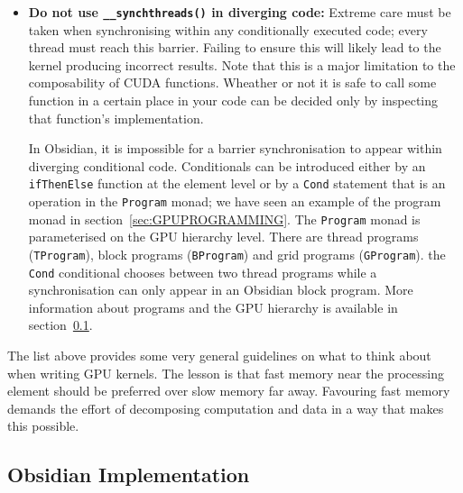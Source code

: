 \documentclass[a4paper]{book}
\begin{document}
\begin{itemize}
\item {\bf Do not use {\tt \_\_synchthreads()} in diverging code:} Extreme care must be taken 
when synchronising within any conditionally executed code; every thread must reach this barrier.
Failing to ensure this will likely lead to the kernel producing incorrect results. Note that 
this is a major limitation to the composability of CUDA functions. Wheather or not it is safe to 
call some function in a certain place in your code can be decided only by inspecting that 
function's implementation. 

In Obsidian, it is impossible for a barrier synchronisation to appear within diverging 
conditional code. Conditionals can be introduced either by an \\{\tt ifThenElse} function 
at the element level or by a {\tt Cond} statement that is an operation in the {\tt Program} 
monad; we have seen an example of the program monad in section~\ref{sec:GPUPROGRAMMING}. 
The {\tt Program} monad is parameterised on the GPU hierarchy level. There are 
thread programs ({\tt TProgram}), block programs ({\tt BProgram}) and grid programs 
({\tt GProgram}). the {\tt Cond} conditional chooses between two thread programs while a 
synchronisation can only appear in an Obsidian block program. More information about programs 
and the GPU hierarchy is available in section~\ref{sec:OBSIMP}.

\end{itemize}  

The list above provides some very general guidelines on what to think about when 
writing GPU kernels. The lesson is that fast memory near the processing element 
should be preferred over slow memory far away. Favouring fast memory demands the effort 
of decomposing computation and data in a way that makes this possible. 

%
%
\subsection{Obsidian Implementation}
\label{sec:OBSIMP}
\end{document}
